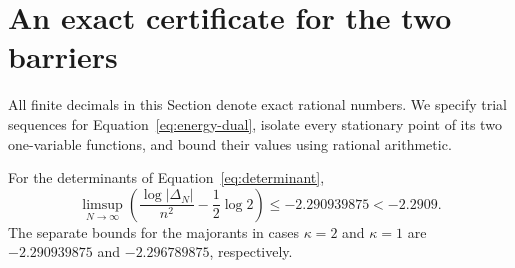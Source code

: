 \section{An exact certificate for the two barriers}\label{sec:certificate}
All finite decimals in this Section denote exact rational numbers.  We specify
trial sequences for Equation~\eqref{eq:energy-dual}, isolate every stationary
point of its two one-variable functions, and bound their values using rational
arithmetic.

\begin{proposition}\label{prop:real-upper}
For the determinants of Equation~\eqref{eq:determinant},
\begin{equation}\label{eq:certified-real-upper}
 \limsup_{N\to\infty}\left(\frac{\log|\Delta_N|}{n^2}
                    -\frac12\log2\right)
 \le -2.290939875<-2.2909.
\end{equation}
The separate bounds for the majorants in cases $\kappa=2$ and $\kappa=1$
are $-2.290939875$ and $-2.296789875$, respectively.
\end{proposition}

